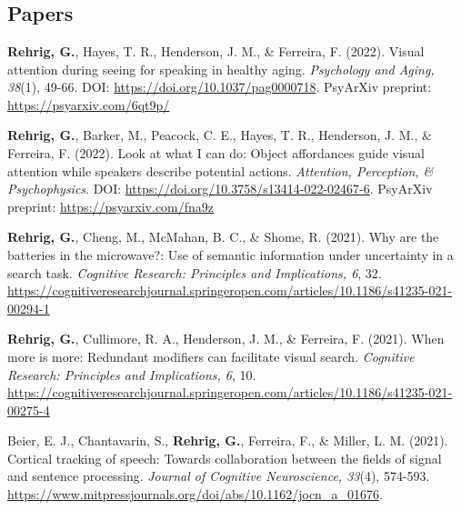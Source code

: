 \section*{}
\label{sec:pubs}

\subsection*{Papers}


\textbf{Rehrig, G.}, Hayes, T. R., Henderson, J. M., \& Ferreira, F. (2022). Visual attention during seeing for speaking in healthy aging. \textit{Psychology and Aging, 38}(1), 49-66. DOI: \url{https://doi.org/10.1037/pag0000718}. PsyArXiv preprint: \url{https://psyarxiv.com/6qt9p/}

\textbf{Rehrig, G.}, Barker, M., Peacock, C. E., Hayes, T. R., Henderson, J. M., \& Ferreira, F. (2022). Look at what I can do: Object affordances guide visual attention while speakers describe potential actions. \textit{Attention, Perception, \& Psychophysics}. DOI: \url{https://doi.org/10.3758/s13414-022-02467-6}. PsyArXiv preprint: \url{https://psyarxiv.com/fna9z}

\textbf{Rehrig, G.}, Cheng, M., McMahan, B. C., \& Shome, R. (2021). Why are the batteries in the microwave?: Use of semantic information under uncertainty in a search task. \textit{Cognitive Research: Principles and Implications, 6}, 32. \url{https://cognitiveresearchjournal.springeropen.com/articles/10.1186/s41235-021-00294-1}

\textbf{Rehrig, G.}, Cullimore, R. A., Henderson, J. M., \& Ferreira, F. (2021). When more is more: Redundant modifiers can facilitate visual search. \textit{Cognitive Research: Principles and Implications, 6}, 10. \url{https://cognitiveresearchjournal.springeropen.com/articles/10.1186/s41235-021-00275-4}

Beier, E. J., Chantavarin, S., \textbf{Rehrig, G.}, Ferreira, F., \& Miller, L. M. (2021). Cortical tracking of speech: Towards collaboration between the fields of signal and sentence processing. \textit{Journal of Cognitive Neuroscience, 33}(4), 574-593. \url{https://www.mitpressjournals.org/doi/abs/10.1162/jocn_a_01676}.

